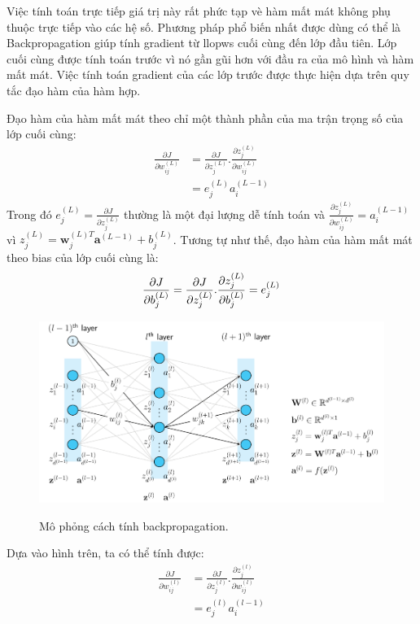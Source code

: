 Việc tính toán trực tiếp giá trị này rất phức tạp vè hàm mất mát không phụ thuộc trực tiếp vào các hệ số. Phương pháp phổ biến nhất được dùng có thể là Backpropagation giúp tính gradient từ llopws cuối cùng đến lớp đầu tiên. Lớp cuối cùng được tính toán trước vì nó gần gũi hơn với đầu ra của mô hình và hàm mất mát. Việc tính toán gradient của các lớp trước được thực hiện dựa trên quy tắc đạo hàm của hàm hợp.

Đạo hàm của hàm mất mát theo chỉ một thành phần của ma trận trọng số của lớp cuối cùng:
\begin{align*}
\frac{\partial J}{\partial w_{ij}^{(L)}} &= \frac{\partial J}{\partial z_{j}^{(L)}}.\frac{\partial z_{j}^{(L)}}{\partial w_{ij}^{(L)}} \\
& = e_{j}^{(L)}a_{i}^{(L-1)}
\end{align*}
Trong đó $e_{j}^{(L)} = \frac{\partial J}{\partial z_{j}^{(L)}}$ thường là một đại lượng dễ tính toán và $\frac{\partial z_{j}^{(L)}}{\partial w_{ij}^{(L)}} = a_{i}^{(L-1)}$ vì $z_{j}^{(L)} = \textbf{w}_{j}^{(L)T}\textbf{a}^{(L-1)}+b_{j}^{(L)}$.
Tương tự như thế, đạo hàm của hàm mất mát theo bias của lớp cuối cùng là:
\begin{equation*}
\frac{\partial J}{\partial b_{j}^{(L)}} = \frac{\partial J}{\partial z_{j}^{(L)}}.\frac{\partial z_{j}^{(L)}}{\partial b_{j}^{(L)}} \\
 = e_{j}^{(L)}
\end{equation*}
\begin{figure}[h]
	\begin{center}
		\includegraphics[height=.40\textheight]{Chuong2/Figs/backpropagation.png}
		\label{fig: Mo phong cach tinh backpropagation}
		\caption{Mô phỏng cách tính backpropagation.}
	\end{center}
\end{figure}
Dựa vào hình trên, ta có thể tính được:
\begin{align*}
\frac{\partial J}{\partial w_{ij}^{(l)}} &= \frac{\partial J}{\partial z_{j}^{(l)}}.\frac{\partial z_{j}^{(l)}}{\partial w_{ij}^{(l)}} \\
& = e_{j}^{(l)}a_{i}^{(l-1)}
\end{align*}
